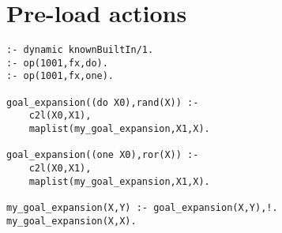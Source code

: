\section{ Pre-load actions
}
\begin{Verbatim}
:- dynamic knownBuiltIn/1.
:- op(1001,fx,do).
:- op(1001,fx,one).

goal_expansion((do X0),rand(X)) :-
    c2l(X0,X1),
    maplist(my_goal_expansion,X1,X).

goal_expansion((one X0),ror(X)) :-
    c2l(X0,X1),
    maplist(my_goal_expansion,X1,X).

my_goal_expansion(X,Y) :- goal_expansion(X,Y),!.
my_goal_expansion(X,X).
\end{Verbatim}
    

